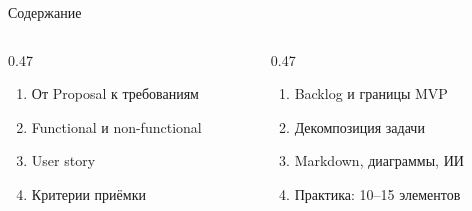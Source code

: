 \begin{frame}{Содержание}
  \vspace{0.4em}
  \begin{columns}[T]
    \begin{column}{0.47\textwidth}
      \begin{enumerate}\setlength\itemsep{0.55em}
        \item От Proposal к требованиям
        \item Functional и non-functional
        \item User story
        \item Критерии приёмки
      \end{enumerate}
    \end{column}
    \begin{column}{0.47\textwidth}
      \begin{enumerate}\setlength\itemsep{0.55em}\setcounter{enumi}{4}
        \item Backlog и границы MVP
        \item Декомпозиция задачи
        \item Markdown, диаграммы, ИИ
        \item Практика: 10--15 элементов
      \end{enumerate}
    \end{column}
  \end{columns}
\end{frame}
